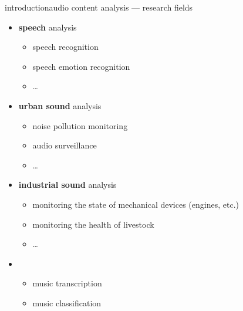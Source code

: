         \begin{frame}{introduction}{audio content analysis --- research fields}
            \begin{itemize}
                \item   \textbf{speech} analysis
                    \begin{itemize}
                        \item   speech recognition
                        \item   speech emotion recognition
                        \item   \ldots
                    \end{itemize}
                \smallskip
                \item   \textbf{urban sound} analysis
                    \begin{itemize}
                        \item   noise pollution monitoring
                        \item   audio surveillance
                        \item   \ldots
                    \end{itemize}
                \smallskip
                \item   \textbf{industrial sound} analysis
                    \begin{itemize}
                        \item   monitoring the state of mechanical devices (engines, etc.)
                        \item   monitoring the health of livestock
                        \item   \ldots
                    \end{itemize}
                \smallskip
                \item   {}
                    \begin{itemize}
                        \item   music transcription
                        \item   music classification
                    \end{itemize}
            \end{itemize}
        \end{frame}
        
